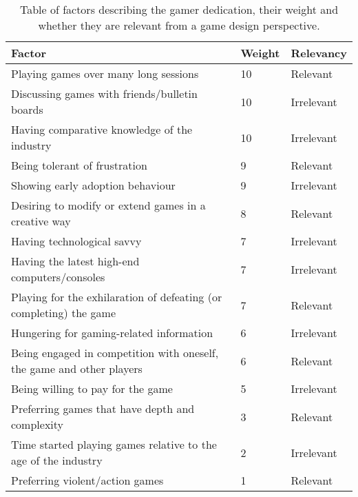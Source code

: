 \begin{table}[H]
\begin{tabular}{|l|l|l|}
\hline
\rowcolor[HTML]{C0C0C0} 
Factor                                                                & Weight 	& Relevancy \\ \hline
Playing games over many long sessions                                 & 10     	& Relevant 	\\ \hline
Discussing games with friends/bulletin boards                         & 10     	& Irrelevant\\ \hline
Having comparative knowledge of the industry                          & 10      & Irrelevant\\ \hline
Being tolerant of frustration                                         & 9       & Relevant 	\\ \hline
Showing early adoption behaviour                                      & 9       & Irrelevant\\ \hline
Desiring to modify or extend games in a creative way                  & 8       & Relevant  \\ \hline
Having technological savvy                                            & 7       & Irrelevant\\ \hline
Having the latest high-end computers/consoles                         & 7       & Irrelevant\\ \hline
Playing for the exhilaration of defeating (or completing) the game    & 7       & Relevant  \\ \hline
Hungering for gaming-related information                              & 6       & Irrelevant\\ \hline
Being engaged in competition with oneself, the game and other players & 6       & Relevant  \\ \hline
Being willing to pay for the game                                     & 5       & Irrelevant\\ \hline
Preferring games that have depth and complexity                       & 3       & Relevant  \\ \hline
Time started playing games relative to the age of the industry        & 2       & Irrelevant\\ \hline
Preferring violent/action games                                       & 1       & Relevant  \\ \hline
\end{tabular}
\caption{Table of factors describing the gamer dedication, their weight and whether they are relevant from a game design perspective.}
\label{tab:gamerdedication}
\end{table}

